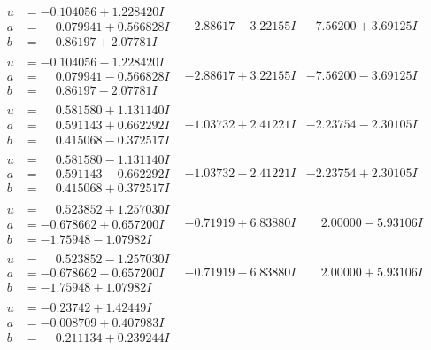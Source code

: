 \documentclass[1p]{elsarticle_modified}
\theoremstyle{definition}
\begin{document}
$$\begin{array}{c|c|c}
\begin{aligned}
u &= -0.104056 + 1.228420 I \\
a &= \phantom{-}0.079941 + 0.566828 I \\
b &= \phantom{-}0.86197 + 2.07781 I\end{aligned}
 & -2.88617 - 3.22155 I & -7.56200 + 3.69125 I \\ \hline\begin{aligned}
u &= -0.104056 - 1.228420 I \\
a &= \phantom{-}0.079941 - 0.566828 I \\
b &= \phantom{-}0.86197 - 2.07781 I\end{aligned}
 & -2.88617 + 3.22155 I & -7.56200 - 3.69125 I \\ \hline\begin{aligned}
u &= \phantom{-}0.581580 + 1.131140 I \\
a &= \phantom{-}0.591143 + 0.662292 I \\
b &= \phantom{-}0.415068 - 0.372517 I\end{aligned}
 & -1.03732 + 2.41221 I & -2.23754 - 2.30105 I \\ \hline\begin{aligned}
u &= \phantom{-}0.581580 - 1.131140 I \\
a &= \phantom{-}0.591143 - 0.662292 I \\
b &= \phantom{-}0.415068 + 0.372517 I\end{aligned}
 & -1.03732 - 2.41221 I & -2.23754 + 2.30105 I \\ \hline\begin{aligned}
u &= \phantom{-}0.523852 + 1.257030 I \\
a &= -0.678662 + 0.657200 I \\
b &= -1.75948 - 1.07982 I\end{aligned}
 & -0.71919 + 6.83880 I & \phantom{-}2.00000 - 5.93106 I \\ \hline\begin{aligned}
u &= \phantom{-}0.523852 - 1.257030 I \\
a &= -0.678662 - 0.657200 I \\
b &= -1.75948 + 1.07982 I\end{aligned}
 & -0.71919 - 6.83880 I & \phantom{-}2.00000 + 5.93106 I \\ \hline\begin{aligned}
u &= -0.23742 + 1.42449 I \\
a &= -0.008709 + 0.407983 I \\
b &= \phantom{-}0.211134 + 0.239244 I\end{aligned}

\end{array}$$
\end{document}
